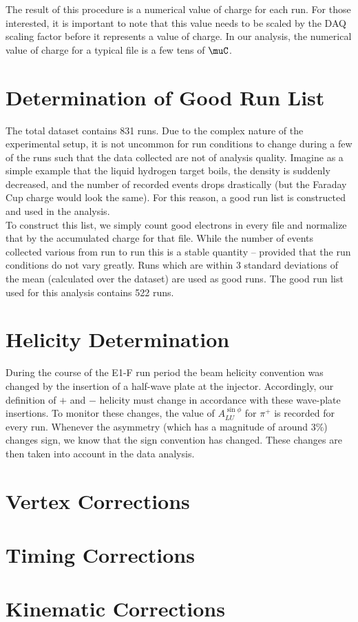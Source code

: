The result of this procedure is a numerical value of charge for each run.  For those interested, it is important to note that this value needs to be scaled by the DAQ scaling factor before it represents a value of charge.  In our analysis, the numerical value of charge for a typical file is a few tens of $\muC$.

\section{Determination of Good Run List}
The total dataset contains 831 runs.  Due to the complex nature of the experimental setup, it is not uncommon for run conditions to change during a few of the runs such that the data collected are not of analysis quality.  Imagine as a simple example that the liquid hydrogen target boils, the density is suddenly decreased, and the number of recorded events drops drastically (but the Faraday Cup charge would look the same).  For this reason, a good run list is constructed and used in the analysis. \\

To construct this list, we simply count good electrons in every file and normalize that by the accumulated charge for that file.  While the number of events collected various from run to run this is a stable quantity -- provided that the run conditions do not vary greatly.  Runs which are within 3 standard deviations of the mean (calculated over the dataset) are used as good runs.  The good run list used for this analysis contains 522 runs.  

\section{Helicity Determination}
During the course of the E1-F run period the beam helicity convention was changed by the insertion of a half-wave plate at the injector.  Accordingly, our definition of $+$ and $-$ helicity must change in accordance with these wave-plate insertions.  To monitor these changes, the value of $A_{LU}^{\sin\phi}$ for $\pi^+$ is recorded for every run.  Whenever the asymmetry (which has a magnitude of around $3\%$) changes sign, we know that the sign convention has changed.  These changes are then taken into account in the data analysis.   

\section{Vertex Corrections}

\section{Timing Corrections}

\section{Kinematic Corrections}
